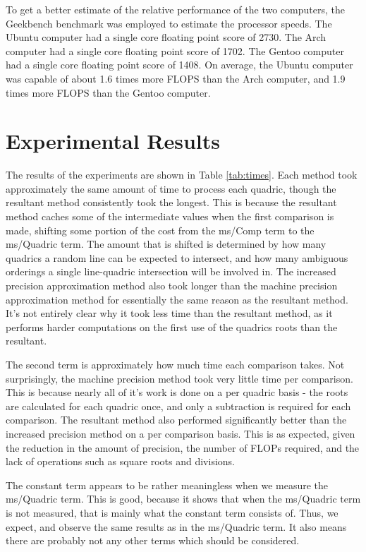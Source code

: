 \documentclass{cccg16}
\begin{document}
To get a better estimate of the relative performance of the two
computers, the Geekbench benchmark was employed to estimate the
processor speeds.  The Ubuntu computer had a single core floating
point score of 2730.  The Arch computer had a single core floating
point score of 1702.  The Gentoo computer had a single core floating
point score of 1408.  On average, the Ubuntu computer was capable of
about 1.6 times more FLOPS than the Arch computer, and 1.9 times more
FLOPS than the Gentoo computer.

\section{Experimental Results}
The results of the experiments are shown in Table \ref{tab:times}.
Each method took approximately the same amount of time to process each
quadric, though the resultant method consistently took the longest.
This is because the resultant method caches some of the intermediate
values when the first comparison is made, shifting some portion of the
cost from the ms/Comp term to the ms/Quadric term.  The
amount that is shifted is determined by how many quadrics a random
line can be expected to intersect, and how many ambiguous orderings a
single line-quadric intersection will be involved in.  The increased
precision approximation method also took longer than the machine
precision approximation method for essentially the same reason as the
resultant method.  It's not entirely clear why it took less time than
the resultant method, as it performs harder computations on the first
use of the quadrics roots than the resultant.

The second term is approximately how much time each comparison takes.
Not surprisingly, the machine precision method took very little time
per comparison.  This is because nearly all of it's work is done on a
per quadric basis - the roots are calculated for each quadric once,
and only a subtraction is required for each comparison. The resultant
method also performed significantly better than the increased
precision method on a per comparison basis.  This is as expected,
given the reduction in the amount of precision, the number of FLOPs
required, and the lack of operations such as square roots and
divisions.

The constant term appears to be rather meaningless when we measure the
ms/Quadric term.  This is good, because it shows that when the
ms/Quadric term is not measured, that is mainly what the constant term
consists of.  Thus, we expect, and observe the same results as in the
ms/Quadric term.  It also means there are probably not any other terms
which should be considered.
\end{document}
